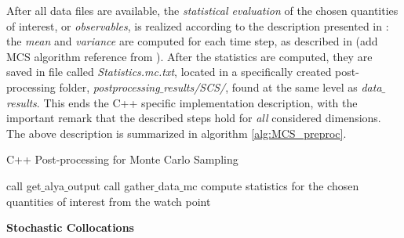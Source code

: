 	After all data files are available, the \emph{statistical evaluation} of the chosen quantities of interest, or \emph{observables}, is realized according to the description presented in : the \emph{mean} and \emph{variance} are computed for each time step, as described in (add MCS algorithm reference from ). After the statistics are computed, they are saved in file called \emph{Statistics.mc.txt}, located in a specifically created post-processing folder, \emph{postprocessing$\_$results/SCS/}, found at the same level as \emph{data$\_$results}. This ends the C++ specific implementation description, with the important remark that the described steps hold for \emph{all} considered dimensions. The above description is summarized in algorithm \ref{alg:MCS_preproc}.
\begin{algorithm}
\caption{C++ Post-processing for Monte Carlo Sampling
\label{alg:MCS_preproc}}
  \begin{algorithmic}[1]
        \State call get$\_$alya$\_$output 
        \State call gather$\_$data$\_$mc 
        \State compute statistics for the chosen quantities of interest from the watch point
    \EndFor
  \end{algorithmic}
\end{algorithm}
\newline
\textbf{Stochastic Collocations}
\newline	
